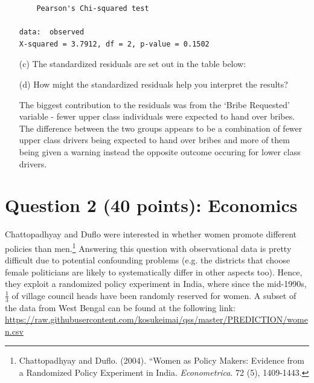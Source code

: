 \documentclass[12pt,letterpaper]{article}
\begin{document}
\begin{enumerate}
\begin{verbatim}
	Pearson's Chi-squared test

data:  observed
X-squared = 3.7912, df = 2, p-value = 0.1502
\end{verbatim}
	\newpage
	\item [(c)] The standardized residuals are set out in the table below:
	\vspace{1cm}

	
	
	\item [(d)] How might the standardized residuals help you interpret the results?  

    The biggest contribution to the residuals was from the `Bribe Requested' variable - 
    fewer upper class individuals were expected to hand over bribes.  The difference 
    between the two groups appears to be a combination of fewer upper class drivers
    being expected to hand over bribes and more of them being given a warning instead 
    the opposite outcome occuring for lower class drivers.
    
  
\end{enumerate}

\newpage

\section*{Question 2 (40 points): Economics}
Chattopadhyay and Duflo were interested in whether women promote different policies than men.\footnote{Chattopadhyay and Duflo. (2004). ``Women as Policy Makers: Evidence from a Randomized Policy Experiment in India. \textit{Econometrica}. 72 (5), 1409-1443.} Answering this question with observational data is pretty difficult due to potential confounding problems (e.g. the districts that choose female politicians are likely to systematically differ in other aspects too). Hence, they exploit a randomized policy experiment in India, where since the mid-1990s, $\frac{1}{3}$ of village council heads have been randomly reserved for women. A subset of the data from West Bengal can be found at the following link: \url{https://raw.githubusercontent.com/kosukeimai/qss/master/PREDICTION/women.csv}\\
\end{document}
